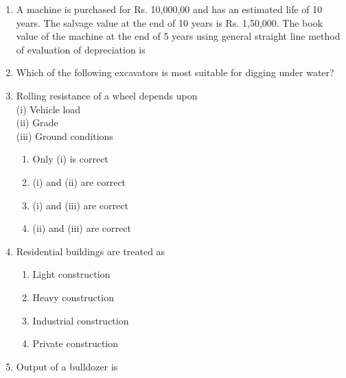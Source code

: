 \documentclass[11pt,a4paper]{article}
\begin{document}
\begin{enumerate}
\begin{enumerate*}[itemjoin=\qquad, label=\Alph*.]
\end{enumerate*}
\item{A machine is purchased for Rs. 10,000,00 and has an estimated life of 10 years. The salvage value at the end of 10 years is Rs. 1,50,000. The book value of the machine at the end of 5 years using general straight line method of evaluation of depreciation is}
\\
\item{Which of the following excavators is most suitable for digging under water?}
\\
\item{Rolling resistance of a wheel depends upon \\
 (i) Vehicle load \\
 (ii) Grade \\
 (iii) Ground conditions}
\begin{enumerate}[label=\Alph*.]
\item{Only (i) is correct}
\item{(i) and (ii) are correct}
\item{(i) and (iii) are correct}
\item{(ii) and (iii) are correct}
\end{enumerate}
\item{Residential buildings are treated as}
\begin{enumerate}[label=\Alph*.]
\item{Light construction}
\item{Heavy construction}
\item{Industrial construction}
\item{Private construction}
\end{enumerate}
\item{Output of a bulldozer is \\
}
\end{enumerate}
\end{document}
